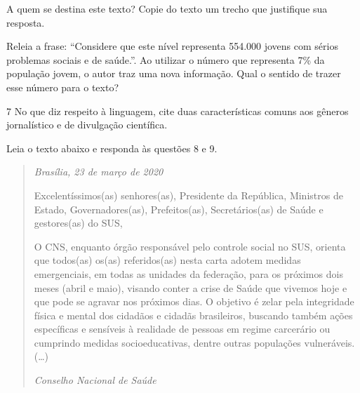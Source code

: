 
\begin{escolha}
  \item A quem se destina este texto? Copie do texto um trecho que justifique
  sua resposta.


  \item Releia a frase: ``Considere que este nível representa 554.000 jovens
  com sérios problemas sociais e de saúde.''. Ao utilizar o número que
  representa 7\% da população jovem, o autor traz uma nova informação.
  Qual o sentido de trazer esse número para o texto?


\end{escolha}

\num{7} No que diz respeito à linguagem, cite duas características comuns aos gêneros
jornalístico e de divulgação científica.


Leia o texto abaixo e responda às questões 8 e 9. 

\begin{quote}

\emph{Brasília, 23 de março de 2020}

Excelentíssimos(as) senhores(as), Presidente da República, Ministros de
Estado, Governadores(as), Prefeitos(as), Secretários(as) de Saúde e
gestores(as) do SUS,

O CNS, enquanto órgão responsável pelo controle social no SUS, orienta
que todos(as) os(as) referidos(as) nesta carta adotem medidas
emergenciais, em todas as unidades da federação, para os próximos dois
meses (abril e maio), visando conter a crise de Saúde que vivemos hoje e
que pode se agravar nos próximos dias. O objetivo é zelar pela
integridade física e mental dos cidadãos e cidadãs brasileiros, buscando
também ações específicas e sensíveis à realidade de pessoas em regime
carcerário ou cumprindo medidas socioeducativas, dentre outras
populações vulneráveis. (\ldots{})

\emph{Conselho Nacional de Saúde} 

\end{quote} 

